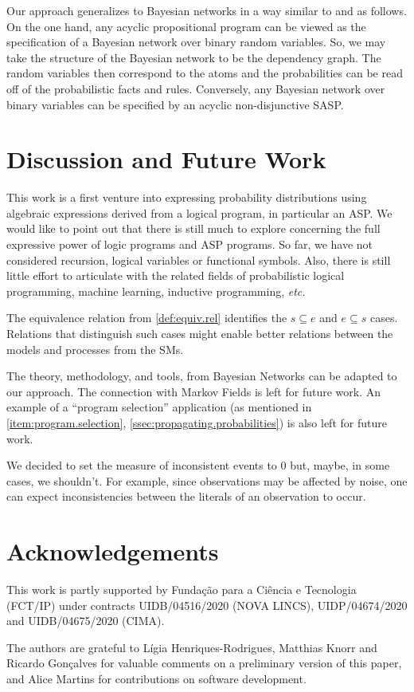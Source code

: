 \documentclass[x11names]{tlp}
\renewcommand{\cite}{\citep}
\begin{document}
Our approach generalizes to Bayesian networks in a way similar to
\cite{cozman2020joy,raedt2016statistical} and
\cite{kiessling1992database,thone1997increased} as follows. On the one hand,
any acyclic propositional program can be viewed as the specification of a
Bayesian network over binary random variables. So, we may take the structure
of the Bayesian network to be the dependency graph. The random variables then
correspond to the atoms and the probabilities can be read off of the
probabilistic facts and rules. Conversely, any Bayesian network over binary
variables can be specified by an acyclic non-disjunctive \ac{SASP}.

\section{Discussion and Future Work}
\label{sec:discussion}

This work is a first venture into expressing probability distributions using
algebraic expressions derived from a logical program, in particular an
\ac{ASP}. We would like to point out that there is still much to explore
concerning the full expressive power of logic programs and \ac{ASP} programs.
So far, we have not considered recursion, logical variables or functional
symbols. Also, there is still little effort to articulate with the related
fields of probabilistic logical programming, machine learning, inductive
programming, \emph{etc.}

The equivalence relation from \cref{def:equiv.rel} identifies the $s
	\subseteq e$ and $e \subseteq s$ cases. Relations that distinguish such cases
might enable better relations between the models and processes from the
\aclp{SM}.

The theory, methodology, and tools, from Bayesian Networks can be adapted to
our approach. The connection with Markov Fields \cite{kindermann80} is left
for future work. An example of a ``program selection'' application (as
mentioned in \cref{item:program.selection},
\cref{ssec:propagating.probabilities}) is also left for future work.

We decided to set the measure of inconsistent events to $0$ but, maybe, in
some cases, we shouldn't. For example, since observations may be affected by
noise, one can expect inconsistencies between the literals of an observation
to occur.

\section*{Acknowledgements}

This work is partly supported by Funda\c{c}\~ao para a Ci\^{e}ncia e
Tecnologia (FCT/IP) under contracts UIDB/04516/2020 (NOVA LINCS),
UIDP/04674/2020 and UIDB/04675/2020 (CIMA).

The authors are grateful to Lígia Henriques-Rodrigues, Matthias Knorr and
Ricardo Gonçalves for valuable comments on a preliminary version of this
paper, and Alice Martins for contributions on software development.

\ifLNCS  \fi
\ifTLP%
	\ifTLPBIB
		
	\else
		
	\fi
\fi


\end{document}
